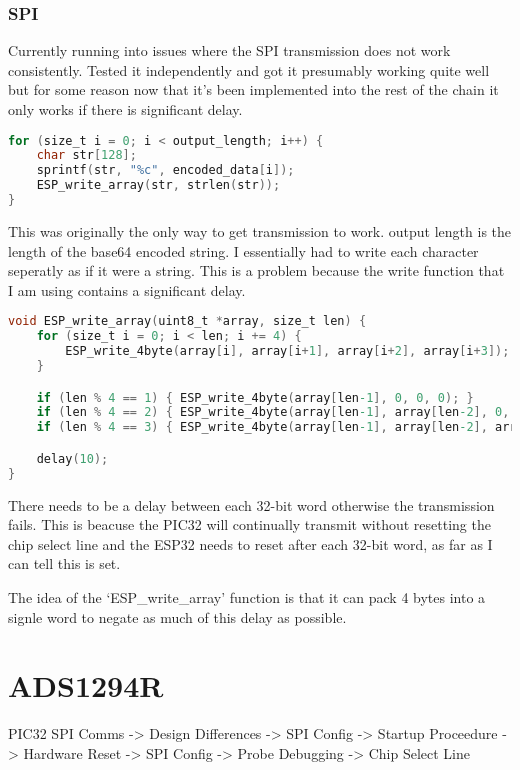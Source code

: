 \subsubsection{SPI}
Currently running into issues where the SPI transmission does not work consistently.
Tested it independently and got it presumably working quite well but for some reason
now that it's been implemented into the rest of the chain it only works if there is
significant delay.

\begin{lstlisting}[language=C]
for (size_t i = 0; i < output_length; i++) {
    char str[128];
    sprintf(str, "%c", encoded_data[i]);
    ESP_write_array(str, strlen(str));
}
\end{lstlisting}

This was originally the only way to get transmission to work.
output length is the length of the base64 encoded string.
I essentially had to write each character seperatly as if it were a string.
This is a problem because the write function that I am using contains a significant delay.

\begin{lstlisting}[language=C]
void ESP_write_array(uint8_t *array, size_t len) {
    for (size_t i = 0; i < len; i += 4) {
        ESP_write_4byte(array[i], array[i+1], array[i+2], array[i+3]);
    }

    if (len % 4 == 1) { ESP_write_4byte(array[len-1], 0, 0, 0); }
    if (len % 4 == 2) { ESP_write_4byte(array[len-1], array[len-2], 0, 0); }
    if (len % 4 == 3) { ESP_write_4byte(array[len-1], array[len-2], array[len-3], 0); }

    delay(10);
}
\end{lstlisting}

There needs to be a delay between each 32-bit word otherwise the transmission fails.
This is beacuse the PIC32 will continually transmit without resetting the chip select line
and the ESP32 needs to reset after each 32-bit word, as far as I can tell this is set.

The idea of the `ESP\_write\_array' function is that it can pack 4 bytes into a signle word
to negate as much of this delay as possible.


\section{ADS1294R}
PIC32 SPI Comms -> Design Differences -> SPI Config -> Startup Proceedure -> Hardware Reset -> SPI Config -> Probe Debugging -> Chip Select Line

